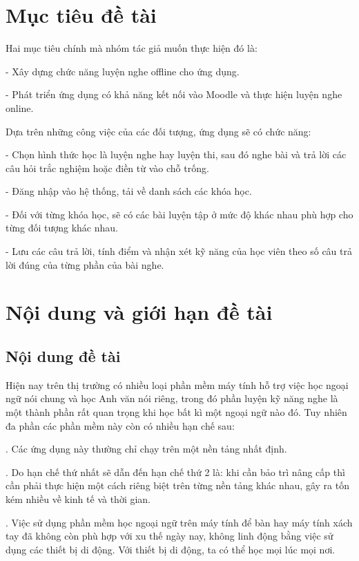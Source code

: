 \section{Mục tiêu đề tài}

Hai mục tiêu chính mà nhóm tác giả muốn thực hiện đó là:

\quad - Xây dựng chức năng luyện nghe offline cho ứng dụng.

\quad - Phát triển ứng dụng có khả năng kết nối vào Moodle và thực hiện luyện nghe online.

Dựa trên những công việc của các đối tượng, ứng dụng sẽ có chức năng:

\quad - Chọn hình thức học là luyện nghe hay luyện thi, sau đó nghe bài và trả lời các câu hỏi trắc nghiệm hoặc điền từ vào chỗ trống.

\quad - Đăng nhập vào hệ thống, tải về danh sách các khóa học.

\quad - Đối với từng khóa học, sẽ có các bài luyện tập ở mức độ khác nhau phù hợp cho từng đối tượng khác nhau.

\quad - Lưu các câu trả lời, tính điểm và nhận xét kỹ năng của học viên theo số câu trả lời đúng của từng phần của bài nghe.

\section{Nội dung và giới hạn đề tài}
\subsection{Nội dung đề tài}

	Hiện nay trên thị trường có nhiều loại phần mềm máy tính hỗ trợ việc học ngoại ngữ nói chung và học Anh văn nói riêng, trong đó phần luyện kỹ năng nghe là một thành phần rất quan trọng khi học bất kì một ngoại ngữ nào đó. Tuy nhiên đa phần các phần mềm này còn có nhiều hạn chế sau:
	
	. Các ứng dụng này thường chỉ chạy trên một nền tảng nhất định.
	
	. Do hạn chế thứ nhất sẽ dẫn đến hạn chế thứ 2 là: khi cần bảo trì nâng cấp thì cần phải thực hiện một cách riêng biệt trên từng nền tảng khác nhau, gây ra tốn kém nhiều về kinh tế và thời gian.
	
	. Việc sử dụng phần mềm học ngoại ngữ trên máy tính để bàn hay máy tính xách tay đã không còn phù hợp với xu thế ngày nay, không linh động bằng việc sử dụng các thiết bị di động. Với thiết bị di động, ta có thể học mọi lúc mọi nơi.
	
